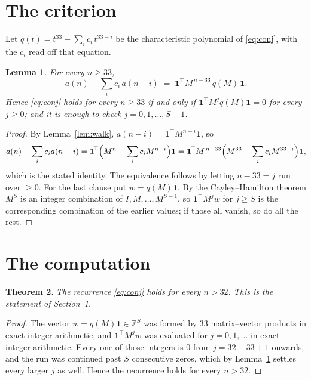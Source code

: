 \documentclass[11pt,a4paper]{article}
\theoremstyle{plain}
\newtheorem{theorem}{Theorem}
\newtheorem{lemma}[theorem]{Lemma}
\theoremstyle{definition}
\begin{document}
\section{The criterion}

Let $q(t)=t^{33}-\sum_{i}c_i\,t^{33-i}$ be the characteristic polynomial of
\eqref{eq:conj}, with the $c_i$ read off that equation.

\begin{lemma}\label{lem:crit}
For every $n\ge33$,
\[
a(n)-\sum_i c_i\,a(n-i)\;=\;\mathbf{1}^{\!\top}M^{\,n-33}\,q(M)\,\mathbf{1} .
\]
Hence \eqref{eq:conj} holds for every $n\ge33$ if and only if
$\mathbf{1}^{\!\top}M^{j}q(M)\mathbf{1}=0$ for every $j\ge0$; and it is enough to
check $j=0,1,\dots,S-1$.
\end{lemma}

\begin{proof}
By Lemma~\ref{lem:walk}, $a(n-i)=\mathbf{1}^{\!\top}M^{n-i}\mathbf{1}$, so
\[
a(n)-\sum_i c_i a(n-i)
=\mathbf{1}^{\!\top}\Bigl(M^{n}-\sum_i c_i M^{n-i}\Bigr)\mathbf{1}
=\mathbf{1}^{\!\top}M^{\,n-33}\Bigl(M^{33}-\sum_i c_i M^{33-i}\Bigr)\mathbf{1},
\]
which is the stated identity. The equivalence follows by letting $n-33=j$ run over
$\ge0$. For the last clause put $w=q(M)\mathbf{1}$. By the Cayley--Hamilton theorem
$M^{S}$ is an integer combination of $I,M,\dots,M^{S-1}$, so
$\mathbf{1}^{\!\top}M^{j}w$ for $j\ge S$ is the corresponding combination of the
earlier values; if those all vanish, so do all the rest.
\end{proof}

\section{The computation}

\begin{theorem}
The recurrence \eqref{eq:conj} holds for every $n>32$. This is the statement of
Section~1.
\end{theorem}

\begin{proof}
The vector $w=q(M)\mathbf{1}\in\mathbb{Z}^{S}$ was formed by $33$ matrix--vector
products in exact integer arithmetic, and $\mathbf{1}^{\!\top}M^{j}w$ was evaluated for
$j=0,1,\dots$ in exact integer arithmetic. Every one of those integers is $0$ from
$j=32-33+1$ onwards, and the run was continued past $S$ consecutive zeros, which by
Lemma~\ref{lem:crit} settles every larger $j$ as well. Hence the recurrence holds for
every $n>32$.
\end{proof}
\end{document}
